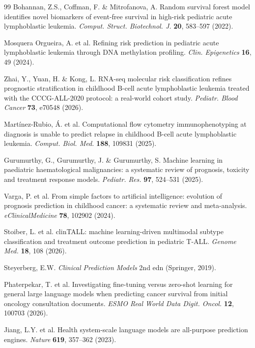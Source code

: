 \documentclass[pdflatex,sn-nature]{sn-jnl}
\begin{document}
\begin{thebibliography}{99}
Bohannan, Z.S., Coffman, F. \& Mitrofanova, A.
Random survival forest model identifies novel biomarkers of event-free
survival in high-risk pediatric acute lymphoblastic leukemia.
\textit{Comput. Struct. Biotechnol. J.} \textbf{20}, 583--597 (2022).

Mosquera Orgueira, A. et al.
Refining risk prediction in pediatric acute lymphoblastic leukemia
through DNA methylation profiling.
\textit{Clin. Epigenetics} \textbf{16}, 49 (2024).

Zhai, Y., Yuan, H. \& Kong, L.
RNA-seq molecular risk classification refines prognostic
stratification in childhood B-cell acute lymphoblastic leukemia
treated with the CCCG-ALL-2020 protocol: a real-world cohort study.
\textit{Pediatr. Blood Cancer} \textbf{73}, e70548 (2026).

Mart\'inez-Rubio, \'{A}. et al.
Computational flow cytometry immunophenotyping at diagnosis is unable
to predict relapse in childhood B-cell acute lymphoblastic leukemia.
\textit{Comput. Biol. Med.} \textbf{188}, 109831 (2025).

Gurumurthy, G., Gurumurthy, J. \& Gurumurthy, S.
Machine learning in paediatric haematological malignancies: a
systematic review of prognosis, toxicity and treatment response models.
\textit{Pediatr. Res.} \textbf{97}, 524--531 (2025).

Varga, P. et al.
From simple factors to artificial intelligence: evolution of prognosis
prediction in childhood cancer: a systematic review and meta-analysis.
\textit{eClinicalMedicine} \textbf{78}, 102902 (2024).

Stoiber, L. et al.
clinTALL: machine learning-driven multimodal subtype classification
and treatment outcome prediction in pediatric T-ALL.
\textit{Genome Med.} \textbf{18}, 108 (2026).

Steyerberg, E.W.
\textit{Clinical Prediction Models} 2nd edn (Springer, 2019).

Phaterpekar, T. et al.
Investigating fine-tuning versus zero-shot learning for general large
language models when predicting cancer survival from initial oncology
consultation documents.
\textit{ESMO Real World Data Digit. Oncol.} \textbf{12}, 100703 (2026).

Jiang, L.Y. et al.
Health system-scale language models are all-purpose prediction engines.
\textit{Nature} \textbf{619}, 357--362 (2023).


\end{thebibliography}
\end{document}
